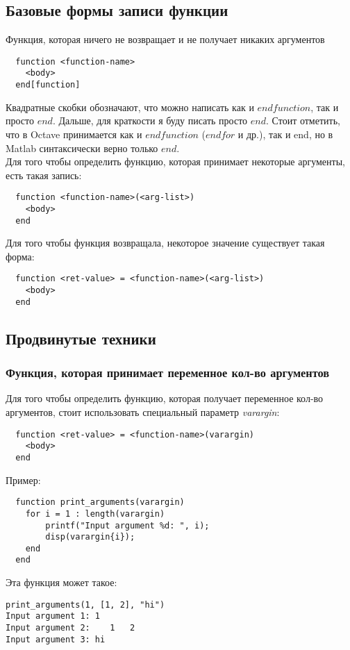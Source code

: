 \documentclass[12pt, a4paper,oneside]{book}
\begin{document}
\subsection{Базовые формы записи функции}
Функция, которая ничего не возвращает и не получает никаких аргументов
\begin{lstlisting}
  function <function-name>
    <body>
  end[function]
\end{lstlisting}
Квадратные скобки обозначают, что можно написать как и $endfunction$, так и просто $end$. Дальше, для краткости я буду писать просто $end$.
Стоит отметить, что в Octave принимается как и $endfunction$ ($endfor$ и др.), так и end, но в Matlab синтаксически верно только $end$.\\

Для того чтобы определить функцию, которая принимает некоторые аргументы, есть такая запись:
\begin{lstlisting}
  function <function-name>(<arg-list>)
    <body>
  end
\end{lstlisting}

Для того чтобы функция возвращала, некоторое значение существует такая форма:
\begin{lstlisting}
  function <ret-value> = <function-name>(<arg-list>)
    <body>
  end
\end{lstlisting}

\subsection{Продвинутые техники}
\subsubsection{Функция, которая принимает переменное кол-во аргументов}
Для того чтобы определить функцию, которая получает переменное кол-во аргументов, стоит использовать специальный параметр \textit{varargin}:
\begin{lstlisting}
  function <ret-value> = <function-name>(varargin)
    <body>
  end
\end{lstlisting}
Пример:
\begin{lstlisting}
  function print_arguments(varargin)
    for i = 1 : length(varargin)
        printf("Input argument %d: ", i);
        disp(varargin{i});
    end
  end
\end{lstlisting}
Эта функция может такое:
\begin{lstlisting}[backgroundcolor=\color{cyan}]
print_arguments(1, [1, 2], "hi")
Input argument 1: 1
Input argument 2:    1   2
Input argument 3: hi
\end{lstlisting}
\end{document}
